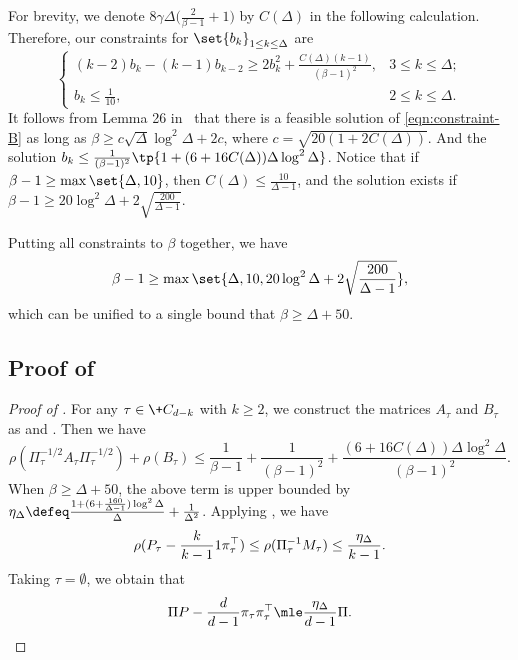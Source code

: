 \documentclass[a4paper,11pt]{article}
\begin{document}
For brevity, we denote ${8\gamma\Delta}\Big(\frac{2}{\beta-1} + 1\Big)$ by $C(\Delta)$ in the following calculation. Therefore, our constraints for $\set{b_k}_{1\leq k\leq \Delta}$ are
\begin{equation}
	\label{eqn:constraint-B}\tag{$\blacktriangle$}
	\begin{cases}
		(k-2) b_k - (k-1)b_{k-2} \ge 2b_k^2+\frac{C(\Delta)(k-1)}{(\beta-1)^2},& 3\le k\le \Delta; \\
		b_k \le \frac1{10}, & 2\le k\le \Delta.
	\end{cases}
\end{equation}
It follows from Lemma 26 in~\cite{WZZ24} that there is a feasible solution of \cref{eqn:constraint-B}
as long as $\beta\ge c\sqrt\Delta\log^2\Delta + 2c$, where $c = \sqrt{20(1+2C(\Delta))}$. And the solution $b_k \leq \frac{1}{(\beta-1)^2}\tp{1+(6+16 C(\Delta))\Delta \log^2 \Delta}$.
Notice that if $\beta - 1\ge \max\set{\Delta, 10}$, then $C(\Delta)\le \frac{10}{\Delta-1}$,
and the solution exists if $\beta - 1\ge 20\log^2\Delta+2\sqrt{\frac{200}{\Delta-1}}$.

Putting all constraints to $\beta$ together, we have
\[\beta-1\ge \max\set{\Delta, 10, 20\log^2\Delta+2\sqrt{\frac{200}{\Delta-1}}},\]
which can be unified to a single bound that $\beta\ge \Delta + 50$.

\subsection{Proof of }
\begin{proof}[Proof of ]
For any $\tau \in \+C_{d-k}$ with $k \geq 2$, we construct the matrices $A_\tau$ and $B_\tau$ as  and . Then we have
    \[ \rho(\Pi_\tau^{-1/2}A_\tau\Pi_\tau^{-1/2})+ \rho(B_\tau) \le \frac{1}{\beta-1}+\frac{1}{(\beta-1)^2} + \frac{(6+16 C(\Delta))\Delta \log^2\Delta}{(\beta-1)^2}.
    \]
When $\beta \geq \Delta + 50$, the above term is upper bounded by $\eta_\Delta \defeq \frac{1+(6+\frac{160}{\Delta-1})\log^2 \Delta}{\Delta}+\frac{1}{\Delta^2}$.
Applying , we have
\[
\rho( P_\tau -\frac{k}{k-1}\*{1} \pi_\tau^\top) \le \rho(\Pi_\tau^{-1} M_\tau) \le \frac{\eta_{\Delta}}{k-1}.
\]
Taking $\tau = \emptyset$, we obtain that
\[
\Pi P - \frac{d}{d-1} \pi_\tau \pi_\tau^\top \mle \frac{\eta_{\Delta}}{d-1}\Pi.
\qedhere
\]
\end{proof}
 
\end{document}
